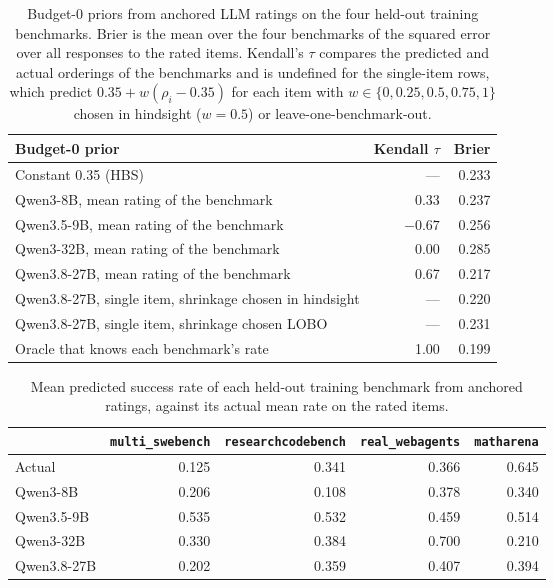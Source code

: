\documentclass{article}
\newcommand{\bench}[1]{\texttt{#1}}
\begin{document}
\begin{table}[ht]
  \caption{Budget-0 priors from anchored LLM ratings on the four held-out training benchmarks. Brier is the mean over the four benchmarks of the squared error over all responses to the rated items. Kendall's $\tau$ compares the predicted and actual orderings of the benchmarks and is undefined for the single-item rows, which predict $0.35 + w(\rho_i - 0.35)$ for each item with $w \in \{0, 0.25, 0.5, 0.75, 1\}$ chosen in hindsight ($w = 0.5$) or leave-one-benchmark-out.}
  \label{tab:bench}
  \centering
  \small
  \begin{tabular}{lrr}
    \toprule
    Budget-0 prior & Kendall $\tau$ & Brier \\
    \midrule
    Constant 0.35 (HBS) & --- & 0.233 \\
    Qwen3-8B, mean rating of the benchmark & 0.33 & 0.237 \\
    Qwen3.5-9B, mean rating of the benchmark & $-0.67$ & 0.256 \\
    Qwen3-32B, mean rating of the benchmark & 0.00 & 0.285 \\
    Qwen3.8-27B, mean rating of the benchmark & 0.67 & 0.217 \\
    Qwen3.8-27B, single item, shrinkage chosen in hindsight & --- & 0.220 \\
    Qwen3.8-27B, single item, shrinkage chosen LOBO & --- & 0.231 \\
    Oracle that knows each benchmark's rate & 1.00 & 0.199 \\
    \bottomrule
  \end{tabular}
\end{table}

\begin{table}[ht]
  \caption{Mean predicted success rate of each held-out training benchmark from anchored ratings, against its actual mean rate on the rated items.}
  \label{tab:bench_means}
  \centering
  \small
  \begin{tabular}{lrrrr}
    \toprule
    & \bench{multi\_swebench} & \bench{researchcodebench} & \bench{real\_webagents} & \bench{matharena} \\
    \midrule
    Actual & 0.125 & 0.341 & 0.366 & 0.645 \\
    Qwen3-8B & 0.206 & 0.108 & 0.378 & 0.340 \\
    Qwen3.5-9B & 0.535 & 0.532 & 0.459 & 0.514 \\
    Qwen3-32B & 0.330 & 0.384 & 0.700 & 0.210 \\
    Qwen3.8-27B & 0.202 & 0.359 & 0.407 & 0.394 \\
    \bottomrule
  \end{tabular}
\end{table}
\end{document}
